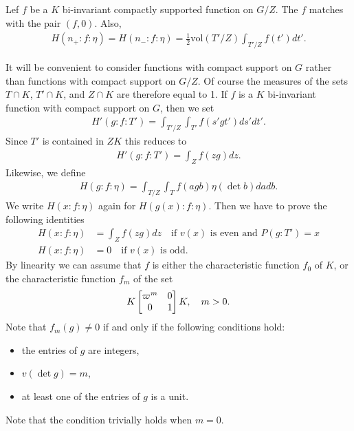 \begin{proposition}\label{prop:5.1}
Lef $f$ be a $K$ bi-invariant compactly supported function on $G/Z$.
The $f$ matches with the pair $(f, 0)$.
Also, 
\begin{align*}
    H(n_+: f: \eta) = H(n_-: f: \eta) = \frac{1}{2} \mathrm{vol}(T'/Z) \int_{T'/Z} f(t')dt'.
\end{align*}
\end{proposition}
It will be convenient to consider functions with compact support on $G$ rather than functions with compact support on $G/Z$.
Of course the measures of the sets $T\cap K$, $T'\cap K$, and $Z\cap K$ are therefore equal to 1.
If $f$ is a $K$ bi-invariant function with compact support on $G$, then we set
\begin{align}
    H'(g:f:T') = \int_{T'/Z} \int_{T'} f(s'gt') ds'dt'.
\end{align}
Since $T'$ is contained in $ZK$ this reduces to
\begin{align}
    H'(g:f:T') = \int_{Z} f(zg) dz.
\end{align}
Likewise, we define
\begin{align}
    H(g:f:\eta) = \int_{T/Z} \int_{T} f(agb) \eta(\det b) dadb.
\end{align}
We write $H(x:f:\eta)$ again for $H(g(x):f:\eta)$.
Then we have to prove the following identities
\begin{align}
    H(x:f:\eta) &= \int_{Z} f(zg) dz \quad \text{if } v(x) \text{ is even and } P(g:T') = x \label{eqn:5.1.4}\\
    H(x:f:\eta) &= 0 \quad \text{if } v(x) \text{ is odd}. \label{eqn:5.1.5}
\end{align}
By linearity we can assume that $f$ is either the characteristic function $f_0$ of $K$, or the characteristic function $f_m$ of the set
\begin{align}
    K \begin{bmatrix} \varpi^m & 0 \\ 0 & 1 \end{bmatrix}K, \quad m > 0.
\end{align}
Note that $f_m(g) \neq 0$ if and only if the following conditions hold:
\begin{itemize}
    \item the entries of $g$ are integers,
    \item $v(\det g) = m$,
    \item at least one of the entries of $g$ is a unit.
\end{itemize}
Note that the condition trivially holds when $m = 0$.

